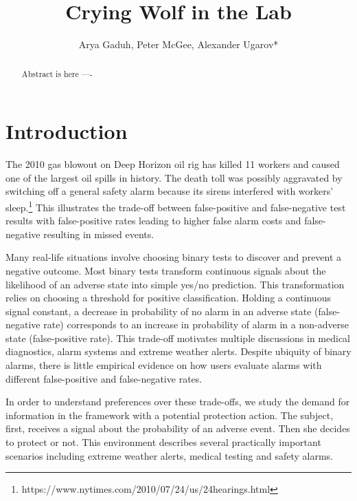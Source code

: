 \documentclass[12pt,a4paper]{article}
\title{\Large Crying Wolf in the Lab\\}
\author{\large Arya Gaduh, Peter McGee, Alexander Ugarov*}
\begin{document}
\maketitle
\onehalfspacing
\begin{abstract}{ Abstract is here ----}


\vspace{10pt}
\begin{singlespace}

\end{singlespace}
\end{abstract}

\vspace{180pt}
\newpage
\normalsize

\section{Introduction}

The 2010 gas blowout on Deep Horizon oil rig has killed 11 workers and caused one of the largest oil spills in history. The death toll was possibly aggravated by switching off a general safety alarm because its sirens interfered with workers' sleep.\footnote{https://www.nytimes.com/2010/07/24/us/24hearings.html} This illustrates the trade-off between false-positive and false-negative test results with false-positive rates leading to higher false alarm costs and false-negative resulting in missed events. 

Many real-life situations involve choosing binary tests to discover and prevent a negative outcome. Most binary tests transform continuous signals about the likelihood of an adverse state into simple yes/no prediction. This transformation relies on choosing a threshold for positive classification. Holding a continuous signal constant, a decrease in probability of no alarm in an adverse state (false-negative rate) corresponds to an increase in probability of alarm in a non-adverse state (false-positive rate). This trade-off motivates multiple discussions in medical diagnostics, alarm systems and extreme weather alerts. Despite ubiquity of binary alarms, there is little empirical evidence on how users evaluate alarms with different false-positive and false-negative rates. 

In order to understand preferences over these trade-offs, we study the demand for information in the framework with a potential protection action. The subject, first, receives a signal about the probability of an adverse event. Then she decides to protect or not. This environment describes several practically important scenarios including extreme weather alerts, medical testing and safety alarms. 
\end{document}
